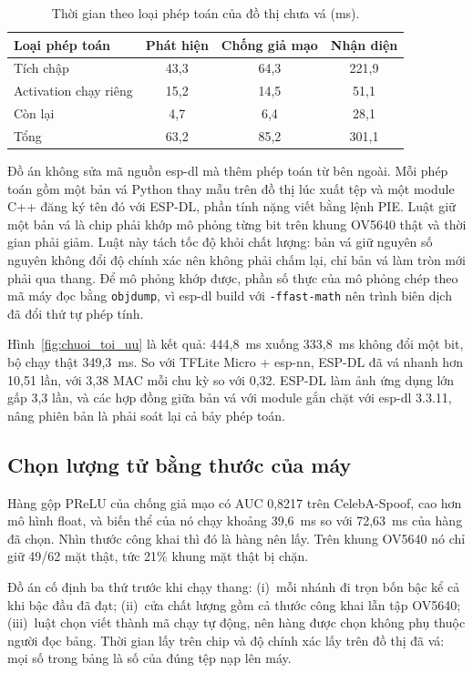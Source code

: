 \documentclass[../DoAn.tex]{subfiles}
\begin{document}
\begin{table}[!htb]
\centering
\small
\caption{Thời gian theo loại phép toán của đồ thị chưa vá (ms).}
\label{tab:gio_theo_op}
\begin{tabular}{|L{4.6cm}|c|c|c|}
\hline
\textbf{Loại phép toán} & \textbf{Phát hiện} & \textbf{Chống giả mạo} & \textbf{Nhận diện} \\
\hline
Tích chập & 43,3 & 64,3 & 221,9 \\
\hline
Activation chạy riêng & 15,2 & 14,5 & 51,1 \\
\hline
Còn lại & 4,7 & 6,4 & 28,1 \\
\hline
Tổng & 63,2 & 85,2 & 301,1 \\
\hline
\end{tabular}
\end{table}

Đồ án không sửa mã nguồn esp-dl mà thêm phép toán từ bên ngoài. Mỗi phép toán gồm một bản vá Python thay mẫu trên đồ thị lúc xuất tệp và một module C++ đăng ký
tên đó với ESP-DL, phần tính nặng viết bằng lệnh PIE. Luật giữ một bản vá là chip phải khớp mô phỏng từng bit trên khung OV5640 thật và thời gian phải giảm. Luật
này tách tốc độ khỏi chất lượng: bản vá giữ nguyên số nguyên không đổi độ chính xác nên không phải chấm lại, chỉ bản vá làm tròn mới phải qua thang. Để mô phỏng
khớp được, phần số thực của mô phỏng chép theo mã máy đọc bằng \texttt{objdump}, vì esp-dl build với \texttt{-ffast-math} nên trình biên dịch đã đổi thứ tự phép
tính.

Hình~\ref{fig:chuoi_toi_uu} là kết quả: 444,8~ms xuống 333,8~ms không đổi một bit, bộ chạy thật 349,3~ms. So với TFLite Micro + esp-nn, ESP-DL đã vá nhanh hơn
10,51 lần, với 3,38 MAC mỗi chu kỳ so với 0,32. ESP-DL làm ảnh ứng dụng lớn gấp 3,3 lần, và các hợp đồng giữa bản vá với module gắn chặt với esp-dl 3.3.11,
nâng phiên bản là phải soát lại cả bảy phép toán.

\subsection{Chọn lượng tử bằng thước của máy}
\label{section:5.8.2}

Hàng gộp PReLU của chống giả mạo có AUC 0,8217 trên CelebA-Spoof, cao hơn mô hình float, và biến thể của nó chạy
khoảng 39,6~ms so với 72,63~ms của hàng đã chọn. Nhìn thước công khai thì đó là hàng nên lấy. Trên khung OV5640 nó chỉ giữ 49/62 mặt thật, tức 21\% khung mặt thật
bị chặn.

Đồ án cố định ba thứ trước khi chạy thang: (i)~mỗi nhánh đi trọn bốn bậc kể cả khi bậc đầu đã đạt; (ii)~cửa chất lượng gồm cả thước công khai lẫn tập OV5640;
(iii)~luật chọn viết thành mã chạy tự động, nên hàng được chọn không phụ thuộc người đọc bảng. Thời gian lấy trên chip và độ chính xác lấy trên đồ thị đã vá: mọi số trong bảng là số của đúng tệp nạp lên máy.
\end{document}
